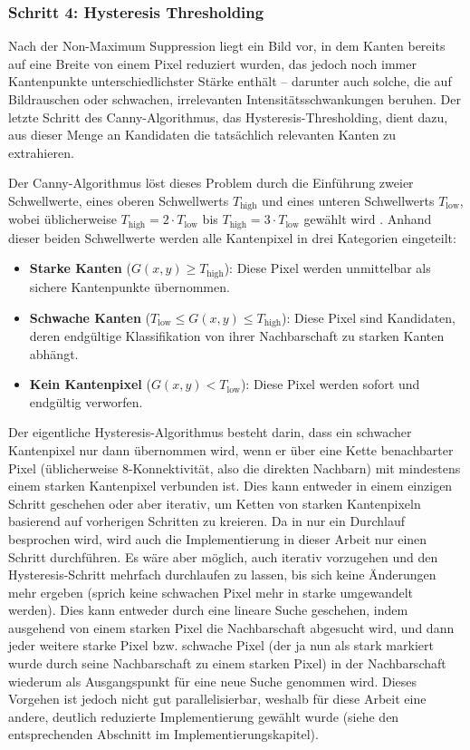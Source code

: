 \subsubsection{Schritt 4: Hysteresis Thresholding}
Nach der Non-Maximum Suppression liegt ein Bild vor, in dem Kanten bereits auf
eine Breite von einem Pixel reduziert wurden, das jedoch noch immer
Kantenpunkte unterschiedlichster Stärke enthält -- darunter auch solche, die
auf Bildrauschen oder schwachen, irrelevanten Intensitätsschwankungen
beruhen. Der letzte Schritt des Canny-Algorithmus, das
Hysteresis-Thresholding, dient dazu, aus dieser Menge an Kandidaten die
tatsächlich relevanten Kanten zu extrahieren.

Der Canny-Algorithmus löst dieses Problem durch die Einführung zweier Schwellwerte, eines
oberen Schwellwerts $T_{\text{high}}$ und eines unteren Schwellwerts
$T_{\text{low}}$, wobei üblicherweise $T_{\text{high}} = 2 \cdot T_{\text{low}}$
bis $T_{\text{high}} = 3 \cdot T_{\text{low}}$ gewählt wird \cite[S. 732.]{gonzalez_digital_2018}. Anhand dieser beiden
Schwellwerte werden alle Kantenpixel in drei Kategorien eingeteilt:

\begin{itemize}
    \item \textbf{Starke Kanten} ($G(x,y) \geq T_{\text{high}}$): Diese Pixel
    werden unmittelbar als sichere Kantenpunkte übernommen.
    \item \textbf{Schwache Kanten} ($T_{\text{low}} \leq G(x,y) \leq
    T_{\text{high}}$): Diese Pixel sind Kandidaten, deren endgültige
    Klassifikation von ihrer Nachbarschaft zu starken Kanten abhängt.
    \item \textbf{Kein Kantenpixel} ($G(x,y) < T_{\text{low}}$): Diese Pixel
    werden sofort und endgültig verworfen.
\end{itemize}

Der eigentliche Hysteresis-Algorithmus besteht darin, dass ein schwacher
Kantenpixel nur dann übernommen wird, wenn er
über eine Kette benachbarter Pixel (üblicherweise 8-Konnektivität, also die direkten Nachbarn) mit
mindestens einem starken Kantenpixel verbunden ist. Dies kann entweder in einem einzigen Schritt geschehen oder aber iterativ, um Ketten von starken Kantenpixeln basierend auf vorherigen Schritten zu kreieren. Da in \cite{gonzalez_digital_2018} nur ein Durchlauf besprochen wird, wird auch die Implementierung in dieser Arbeit nur einen Schritt durchführen. Es wäre aber möglich, auch iterativ vorzugehen und den Hysteresis-Schritt mehrfach durchlaufen zu lassen, bis sich keine Änderungen mehr ergeben (sprich keine schwachen Pixel mehr in starke umgewandelt werden). Dies kann entweder durch eine lineare Suche geschehen, indem ausgehend von einem starken Pixel die Nachbarschaft abgesucht wird, und dann jeder weitere starke Pixel bzw. schwache Pixel (der ja nun als stark markiert wurde durch seine Nachbarschaft zu einem starken Pixel) in der Nachbarschaft wiederum als Ausgangspunkt für eine neue Suche genommen wird. Dieses Vorgehen ist jedoch nicht gut parallelisierbar, weshalb für diese Arbeit eine andere, deutlich reduzierte Implementierung gewählt wurde (siehe den entsprechenden Abschnitt im Implementierungskapitel).

